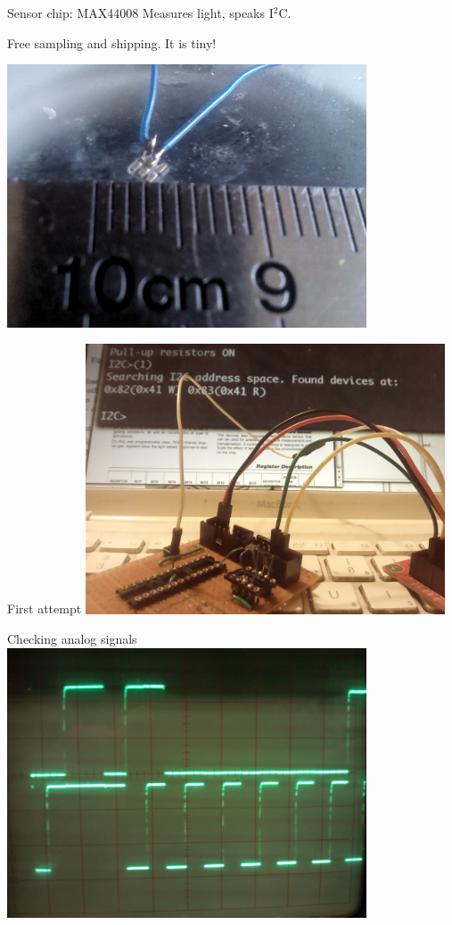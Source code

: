 	\begin{frame}{Sensor chip: MAX44008}
		Measures light, speaks I${}^2$C.

		Free sampling and shipping. It is tiny!
		\pause

		\centering
		\includegraphics[width=0.8\textwidth]{sensorCables.jpg}
	\end{frame}

	\begin{frame}{First attempt}
		\centering
		\includegraphics[width=0.8\textwidth]{buspirate.jpg}
	\end{frame}


	\begin{frame}{Checking analog signals}
		\centering
		\includegraphics[width=0.8\textwidth]{oscilloscope.jpg}
	\end{frame}


